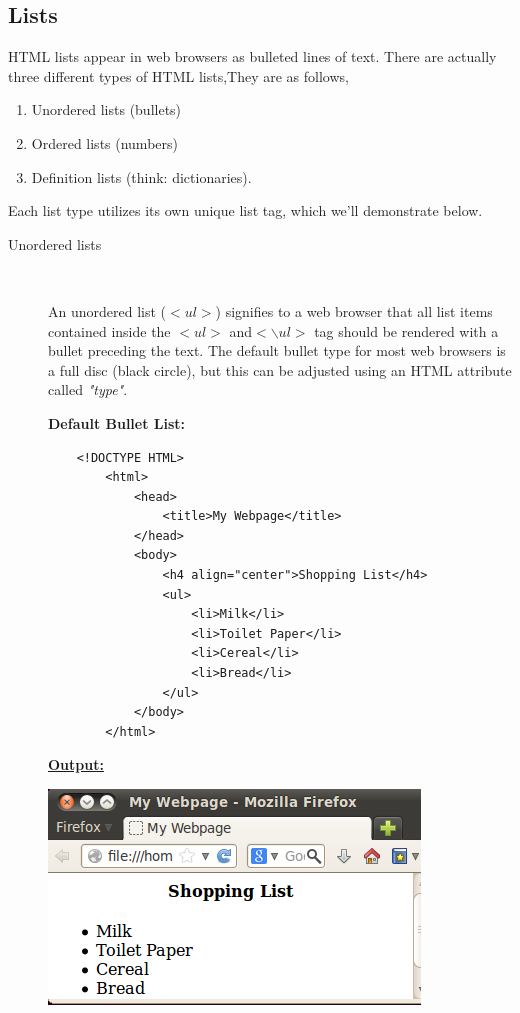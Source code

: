 \documentclass[11pt,a4paper]{article}
\begin{document}
\subsection*{Lists}
\hspace{1cm} HTML lists appear in web browsers as bulleted lines of text. There are actually three different types of HTML lists,They are as follows,
\begin{enumerate}
\item Unordered lists (bullets)
\item Ordered lists (numbers)
\item Definition lists (think: dictionaries).
\end{enumerate}
 Each list type utilizes its own unique list tag, which we'll demonstrate below.\
\begin{description}
\item[Unordered lists]\

An unordered list ($<ul>$) signifies to a web browser that all list items contained inside the $<ul>$ and$<\backslash ul>$ tag should be rendered with a bullet preceding the text. The default bullet type for most web browsers is a full disc (black circle), but this can be adjusted using an HTML attribute called \emph{"type"}.\

\textbf{Default Bullet List:}
\begin{verbatim}
    <!DOCTYPE HTML>
        <html>
            <head>
                <title>My Webpage</title>
            </head>
            <body>
                <h4 align="center">Shopping List</h4>
                <ul>
                    <li>Milk</li>
                    <li>Toilet Paper</li>
                    <li>Cereal</li>
                    <li>Bread</li>
                </ul>
            </body>
        </html>
\end{verbatim}

\underline{\textbf{Output:}}\

\includegraphics[scale=0.7]{DefaultList.png}\


\end{description}
\end{document}
